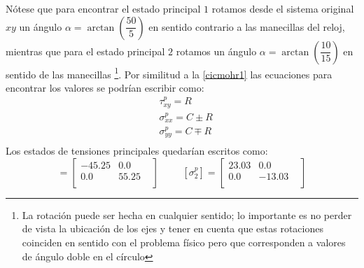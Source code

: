 \documentclass[../notas medios.tex]{subfiles}
\begin{document}
\begin{enumerate}
%
%
%
Nótese que para encontrar el estado principal $1$ rotamos desde el sistema
original $xy$ un ángulo $\alpha = \arctan\left(\dfrac{50}{5}\right)$ en sentido
contrario a las manecillas del reloj, mientras que para el estado principal $2$
rotamos un ángulo $\alpha = \arctan\left(\dfrac{10}{15}\right)$ en sentido de
las manecillas \footnote{La rotación puede ser hecha en cualquier sentido; lo
importante es no perder de vista la ubicación de los ejes y tener en cuenta
que estas rotaciones coinciden en sentido con el problema físico pero que
corresponden a valores de ángulo doble en el círculo}.
Por similitud a la  \cref{cicmohr1} las ecuaciones para encontrar los valores se podrían escribir como:\\
%
\begin {equation}
\begin {aligned}
&\tau^p_{xy} = R \\
&\sigma^p_{xx} = C \pm R \\
&\sigma^p_{yy} = C \mp R  \\
\end {aligned}
\label{cicmohr2}
\end {equation}
%
Los estados de tensiones principales quedarían escritos como:\\
%
 \begin{equation}
[\sigma^p_{1}] =
 	\begin{bmatrix}
     	-45.25 & 0.0 &  \\
     	0.0 & 55.25 \\
 	\end{bmatrix}
 \hspace{1cm}
 [\sigma^p_{2}] =
 	\begin{bmatrix}
     	23.03 & 0.0 &  \\
     	0.0 & -13.03 \\
 	\end{bmatrix}
\end{equation}
%


\end{enumerate}
\end{document}
